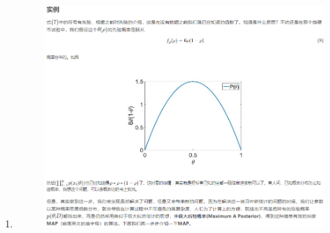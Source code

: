 \documentclass[12pt]{ctexart}%
\begin{document}
\begin{enumerate}
			\item[] 
				\begin{figure}[H]
					\vspace{-0.2cm}  %
					\centering
					\includegraphics[scale=0.8]{example_bayes.png}
					\renewcommand{\figurename}{Fig} %
				\end{figure}
			

\end{enumerate}
\end{document}
